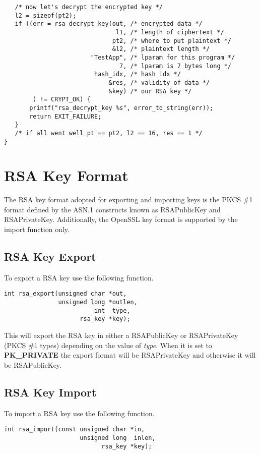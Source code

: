 \documentclass[synpaper]{book}
\newcommand{\mysection}[1]    %
	{                   %
	\section{#1}
   \markboth{\textsf{www.libtom.org}}{\thesection ~ {#1}}
	}
\begin{document}
\begin{small}
\begin{verbatim}
   /* now let's decrypt the encrypted key */
   l2 = sizeof(pt2);
   if ((err = rsa_decrypt_key(out, /* encrypted data */
                               l1, /* length of ciphertext */
                              pt2, /* where to put plaintext */
                              &l2, /* plaintext length */
                        "TestApp", /* lparam for this program */
                                7, /* lparam is 7 bytes long */
                         hash_idx, /* hash idx */
                             &res, /* validity of data */
                             &key) /* our RSA key */ 
        ) != CRYPT_OK) {
       printf("rsa_decrypt_key %s", error_to_string(err));
       return EXIT_FAILURE;
   }
   /* if all went well pt == pt2, l2 == 16, res == 1 */
}
\end{verbatim}
\end{small}

\mysection{RSA Key Format}

The RSA key format adopted for exporting and importing keys is the PKCS \#1 format defined by the ASN.1 constructs known as 
RSAPublicKey and RSAPrivateKey.  Additionally, the OpenSSL key format is supported by the import function only.

\subsection{RSA Key Export}
To export a RSA key use the following function.

\begin{verbatim}
int rsa_export(unsigned char *out, 
               unsigned long *outlen, 
                         int  type, 
                     rsa_key *key);
\end{verbatim}
This will export the RSA key in either a RSAPublicKey or RSAPrivateKey (PKCS \#1 types) depending on the value of \textit{type}.  When it is 
set to \textbf{PK\_PRIVATE} the export format will be RSAPrivateKey and otherwise it will be RSAPublicKey.

\subsection{RSA Key Import}
To import a RSA key use the following function.

\begin{verbatim}
int rsa_import(const unsigned char *in, 
                     unsigned long  inlen, 
                           rsa_key *key);
\end{verbatim}
\end{document}
